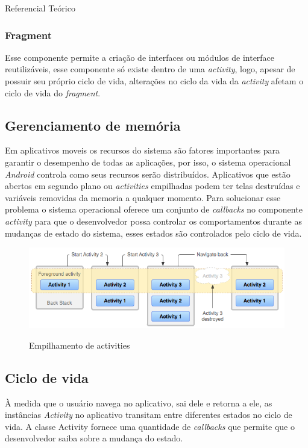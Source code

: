 \documentclass[
	12pt,				%
	openright,			%
	twoside,			%
	a4paper,			%
	english,			%
	french,				%
	spanish,			%
	brazil				%
	]{abntex2}
\begin{document}
\begin{chapter}{Referencial Teórico}
\subsubsection{Fragment}
Esse componente permite a criação de interfaces ou módulos de interface reutilizáveis, esse componente só existe dentro de uma \textit{activity}, logo, apesar de possuir seu próprio ciclo de vida, alterações no ciclo da vida da \textit{activity} afetam o ciclo de vida do \textit{fragment}.  

\subsection{Gerenciamento de memória}
Em aplicativos moveis os recursos do sistema são fatores importantes para garantir o desempenho de todas as aplicações, por isso, o sistema operacional \textit{Android} controla como seus recursos serão distribuídos. Aplicativos que estão abertos em segundo plano ou \textit{activities} empilhadas podem ter telas destruídas e variáveis removidas da memoria a qualquer momento. Para solucionar esse problema o sistema operacional oferece um conjunto de \textit{callbacks} no componente \textit{activity} para que o desenvolvedor possa controlar os comportamentos durante as mudanças de estado do sistema, esses estados são controlados pelo ciclo de vida.

\begin{figure}[h]
\centering
   \caption{Empilhamento de activities}
   \includegraphics[scale=0.70]{media/diagram_backstack.png}
     \label{fig:backstack}
\end{figure}

\subsection{Ciclo de vida}
À medida que o usuário navega no aplicativo, sai dele e retorna a ele, as instâncias \textit{Activity} no aplicativo transitam entre diferentes estados no ciclo de vida. A classe Activity fornece uma quantidade de \textit{callbacks} que permite que o desenvolvedor saiba sobre a mudança do estado.


\end{chapter}
\end{document}
